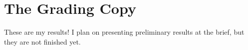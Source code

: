 \section{The Grading Copy}
These are my results! I plan on presenting preliminary results at the brief, but they are not finished yet. 
